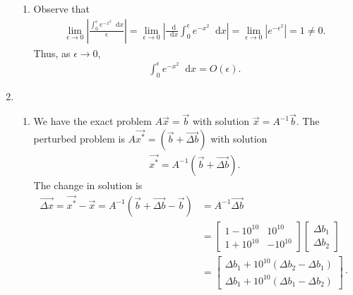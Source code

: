\documentclass[10pt]{article}
\newcommand*{\dif}{\mathop{}\!\mathrm{d}}
\begin{document}
\begin{enumerate}
\begin{enumerate}
      \item Observe that \begin{align*}
        \lim _{\epsilon \to 0} \left| \frac{\int_0^\epsilon e^{-x^2}\dif x}{\epsilon } \right| = \lim _{\epsilon \to 0} \left| \frac{\dif}{\dif x}\int_0^\epsilon e^{-x^2}\dif x \right| = \lim _{\epsilon \to 0} \left|  e^{-\epsilon^2} \right| = 1 \neq 0.
      \end{align*} Thus, as \(\epsilon  \to 0\), \begin{align*}
        \int_0^\epsilon e^{-x^2}\dif x = O(\epsilon).
      \end{align*}
    \end{enumerate}

    \item \begin{enumerate}
      \item We have the exact problem \(A\vec{x}=\vec{b}\) with solution \(\vec{x} = A^{-1}\vec{b}\). The perturbed problem is \(A\vec{x^\ast}=(\vec{b}+\vec{\Delta b})\) with solution \begin{align*}
          \vec{x^\ast} = A^{-1}(\vec{b}+\vec{\Delta b}).
      \end{align*} The change in solution is \begin{align}
        \vec{\Delta x} = \vec{x^\ast} - \vec{x} = A^{-1} \left(\vec{b} +  \vec{\Delta b} - \vec{b}\right) &= A^{-1} \vec{\Delta b} \nonumber \\ 
        &= \begin{bmatrix}
          1-10^{10} & 10^{10} \\ 1 + 10^{10} & -10^{10}
        \end{bmatrix} \begin{bmatrix}
          \Delta b_1 \\ \Delta b_2
        \end{bmatrix} \nonumber \\
        &= \begin{bmatrix}
          \Delta b_1 + 10^{10} \left( \Delta b_2 - \Delta b_1 \right) \\
          \Delta b_1 + 10^{10} \left( \Delta b_1 - \Delta b_2 \right)
        \end{bmatrix}\cdot  \label{eq:2pert}
      \end{align}


\end{enumerate}
\end{enumerate}
\end{document}
